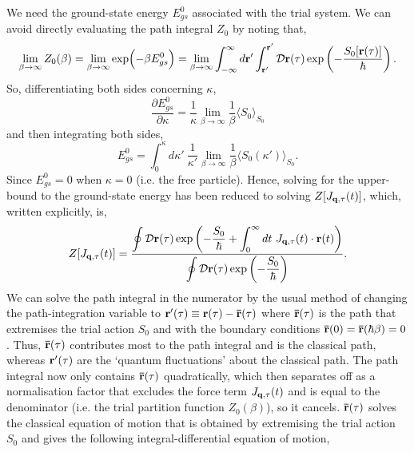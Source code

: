 We need the ground-state energy $E^0_{gs}$ associated with the trial system. We can avoid directly evaluating the path integral $Z_0$ by noting that,
\begin{equation}
    \lim_{\beta \to \infty} Z_0(\beta) = \lim_{\beta \to \infty} \exp(-\beta E^0_{gs}) = \lim_{\beta \to \infty} \int^{\infty}_{-\infty} d\vb{r}' \int^{\vb{r}'}_{\vb{r}'} \mathcal{D}\vb{r}(\tau) \exp\left(-\frac{S_0[\vb{r}(\tau)]}{\hbar}\right).
\label{eqn-222-13:trial_partition}
\end{equation}
So, differentiating both sides concerning $\kappa$,
\begin{equation}
     \frac{\partial E_{gs}^0}{\partial \kappa} = \frac{1}{\kappa} \lim_{\beta\to\infty} \frac{1}{\beta} \langle S_0 \rangle_{S_0}
    \label{eqn-222-14}
\end{equation}
and then integrating both sides,
\begin{equation}
    E^{0}_{gs} = \int^{\kappa}_0 d\kappa'\ \frac{1}{\kappa'} \lim_{\beta\to\infty} \frac{1}{\beta} \langle S_0(\kappa') \rangle_{S_0} .
\label{eqn-222-15}
\end{equation}
Since $ E^{0}_{gs} = 0$ when $\kappa = 0$ (i.e. the free particle). Hence, solving for the upper-bound to the ground-state energy has been reduced to solving $Z[J_{\vb{q},\tau}(t)]$, which, written explicitly, is,
\begin{equation}
    Z[J_{\vb{q},\tau}(t)] = \frac{\displaystyle \oint \mathcal{D}\vb{r}(\tau) \exp\left(-\frac{S_0}{\hbar} + \int^{\infty}_0 dt\ J_{\vb{q},\tau}(t) \cdot \vb{r}(t) \right)}{\displaystyle \oint \mathcal{D}\vb{r}(\tau) \exp\left(-\frac{S_0}{\hbar}\right)}.
\label{eqn-222-16:generating_functional}
\end{equation}
We can solve the path integral in the numerator by the usual method of changing the path-integration variable to $\vb{r}'(\tau) \equiv \vb{r}(\tau) - \vb{\bar{r}}(\tau)$ where $\vb{\bar{r}}(\tau)$ is the path that extremises the trial action $S_0$ and with the boundary conditions $\vb{\bar{r}}(0) = \vb{\bar{r}}(\hbar\beta) = 0$. Thus, $\vb{\bar{r}}(\tau)$ contributes most to the path integral and is the classical path, whereas $\vb{r}'(\tau)$ are the `quantum fluctuations' about the classical path. The path integral now only contains $\vb{\bar{r}}(\tau)$ quadratically, which then separates off as a normalisation factor that excludes the force term $J_{\vb{q},\tau}(t)$ and is equal to the denominator (i.e. the trial partition function $Z_0(\beta)$), so it cancels. $\vb{\bar{r}}(\tau)$ solves the classical equation of motion that is obtained by extremising the trial action $S_0$ and gives the following integral-differential equation of motion,
